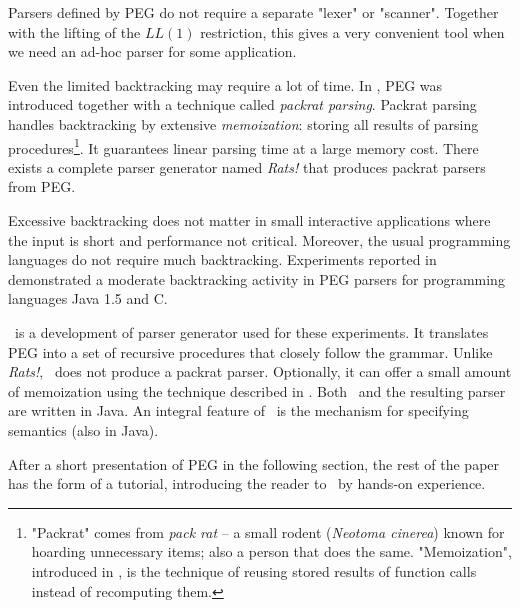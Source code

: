 Parsers defined by PEG
do not require a separate "lexer" or "scanner".
Together with the lifting of the $LL(1)$ restriction,
this gives a very convenient tool when we need 
an ad-hoc parser for some application.

Even the limited backtracking may require a lot of time.
In \cite{Ford:2002,Ford:Thesis}, PEG was introduced together with
a technique called \emph{packrat parsing}.
Packrat parsing handles backtracking
by extensive \emph{memoization}: storing all results
of parsing procedures\footnote{
"Packrat" comes from \emph{pack rat} -- a small rodent (\emph{Neotoma cinerea})  
known for hoarding unnecessary items; also a person that does the same.
"Memoization", introduced in \cite{Michie:1968}, is the technique  
of reusing stored results of function calls instead of recomputing them.}.
It guarantees linear parsing time at a large memory cost.
There exists a complete parser generator named \textsl{Rats!} \cite{Grimm:2004,Grimm:Rats}
that produces packrat parsers from PEG.

Excessive backtracking does not matter 
in small interactive applications
where the input is short and performance not critical.
Moreover, the usual programming languages
do not require much backtracking.
%
Experiments reported in \cite{Redz:2007:FI,Redz:2008:FI}
demonstrated a moderate backtracking activity  
in PEG parsers for programming languages Java 1.5 and C.

\medskip
\Mouse\ is a development of parser generator used for these experiments.
It translates PEG into a set of recursive procedures that closely follow the grammar.
Unlike \textsl{Rats!}, \Mouse\ does not produce a packrat parser.
Optionally, it can offer a small amount of memoization using the technique
described in \cite{Redz:2007:FI}.
Both \Mouse\ and the resulting parser are written in Java.
%
An integral feature of \Mouse\ is the mechanism for specifying
semantics (also in Java). 

\medskip
After a short presentation of PEG in the following section,
the rest of the paper has the form of a tutorial,
introducing the reader to \Mouse\ by hands-on experience.
